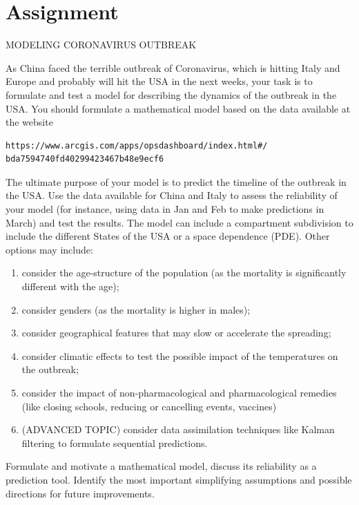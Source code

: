 \newpage
\sffamily
\pagecolor{yellow}

\section*{Assignment}

MODELING CORONAVIRUS OUTBREAK

As China faced the terrible outbreak of Coronavirus, which is hitting Italy and Europe and probably will hit the USA in the next weeks, 
your task is to formulate and test a model for describing the dynamics of the outbreak in the USA. You should formulate a mathematical model based on the data available at the website

\begin{verbatim}
https://www.arcgis.com/apps/opsdashboard/index.html#/
bda7594740fd40299423467b48e9ecf6
\end{verbatim}

 

The ultimate purpose of your model is to predict the timeline of the outbreak in the USA.   
 Use the data available for China and Italy to assess the reliability of your model (for instance, using data in Jan and Feb to make predictions in March)
 and test the results.
The model can include a compartment subdivision to include the different States of the USA or a space dependence (PDE). 
Other options may include:
\begin{enumerate}
      \item consider the age-structure of the population (as the mortality is significantly different with the age);
      \item consider genders (as the mortality is higher in males);
      \item consider geographical features that may slow or accelerate the spreading;
      \item consider climatic effects to test the possible impact of the temperatures on the outbreak;
      \item consider the impact of non-pharmacological and pharmacological remedies (like closing schools, reducing or cancelling events, vaccines)
      \item (ADVANCED TOPIC) consider data assimilation techniques like Kalman filtering to formulate sequential predictions.
\end{enumerate}

Formulate and motivate a mathematical model, discuss its reliability as a prediction tool.
Identify the most important simplifying assumptions and possible directions for future improvements.






